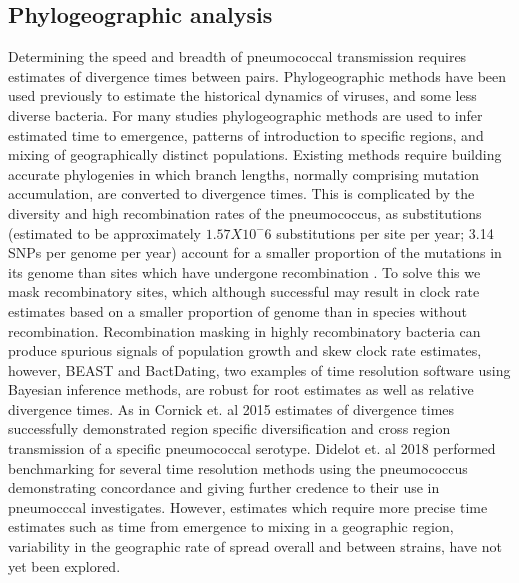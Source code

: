 \documentclass{article}
\begin{document}
\subsection{Phylogeographic analysis} 
Determining the speed and breadth of pneumococcal transmission requires estimates of divergence times between pairs. Phylogeographic methods have been used previously to estimate the historical dynamics of viruses, and some less diverse bacteria. For many studies phylogeographic methods are used to infer estimated time to emergence, patterns of introduction to specific regions, and mixing of geographically distinct populations\cite{wangGenomicEpidemiologyVibrio2020a,weillGenomicHistorySeventh2017,chihotaGeospatialDistributionMycobacterium2018,bartGlobalPopulationStructure2014,comasOutofAfricaMigrationNeolithic2013,allicockPhylogeographyPopulationDynamics2012,okoroIntracontinentalSpreadHuman2012,mutrejaEvidenceSeveralWaves2011,lemeyBayesianPhylogeographyFinds2009a}. Existing methods require building accurate phylogenies in which branch lengths, normally comprising mutation accumulation, are converted to divergence times. This is complicated by the diversity and high recombination rates of the pneumococcus, as substitutions (estimated to be approximately $1.57X10^-6$ substitutions per site per year; 3.14 SNPs per genome per year) account for a smaller proportion of the mutations in its genome than sites which have undergone recombination \cite{croucherRapidPneumococcalEvolution2011}. To solve this we mask recombinatory sites, which although successful may result in clock rate estimates based on a smaller proportion of genome than in species without recombination. Recombination masking in highly recombinatory bacteria can produce spurious signals of population growth and skew clock rate estimates, however, BEAST and BactDating, two examples of time resolution software using Bayesian inference methods, are robust for root estimates as well as relative divergence times\cite{cornickRegionspecificDiversificationHighly2015,gladstoneInternationalGenomicDefinition2019b,croucherRapidPhylogeneticAnalysis2015,didelotBayesianInferenceAncestral2018,drummondBayesianEvolutionaryAnalysis2015,lapierreImpactSelectionGene2016}. As in Cornick et. al 2015 estimates of divergence times successfully demonstrated region specific diversification and cross region transmission of a specific pneumococcal serotype\cite{cornickRegionspecificDiversificationHighly2015}.
Didelot et. al 2018 performed benchmarking for several time resolution methods using the pneumococcus demonstrating concordance and giving further credence to their use in pneumocccal investigates\cite{didelotBayesianInferenceAncestral2018}. However, estimates which require more precise time estimates such as time from emergence to mixing in a geographic region, variability in the geographic rate of spread overall and between strains, have not yet been explored.  
\end{document}
